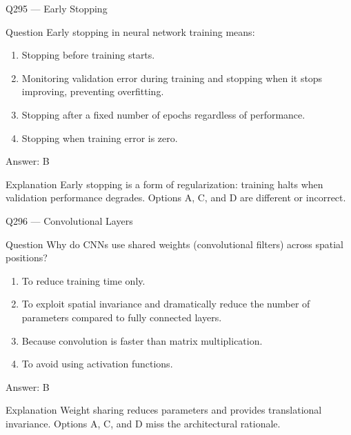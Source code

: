 \documentclass[aspectratio=169,8pt]{beamer}
\begin{document}
\begin{frame}{Q295 --- Early Stopping}
\begin{block}{Question}
Early stopping in neural network training means:
\begin{enumerate}
\item Stopping before training starts.
\item Monitoring validation error during training and stopping when it stops improving, preventing overfitting.
\item Stopping after a fixed number of epochs regardless of performance.
\item Stopping when training error is zero.
\end{enumerate} \end{block}
\begin{exampleblock}{Answer: B}\end{exampleblock}
\begin{block}{Explanation}
Early stopping is a form of regularization: training halts when validation performance degrades. Options A, C, and D are different or incorrect.
\end{block}
\end{frame}

\begin{frame}{Q296 --- Convolutional Layers}
\begin{block}{Question}
Why do CNNs use shared weights (convolutional filters) across spatial positions?
\begin{enumerate}
\item To reduce training time only.
\item To exploit spatial invariance and dramatically reduce the number of parameters compared to fully connected layers.
\item Because convolution is faster than matrix multiplication.
\item To avoid using activation functions.
\end{enumerate}\end{block}
\begin{exampleblock}{Answer: B}\end{exampleblock}
\begin{block}{Explanation}
Weight sharing reduces parameters and provides translational invariance. Options A, C, and D miss the architectural rationale.
\end{block}
\end{frame}
\end{document}
